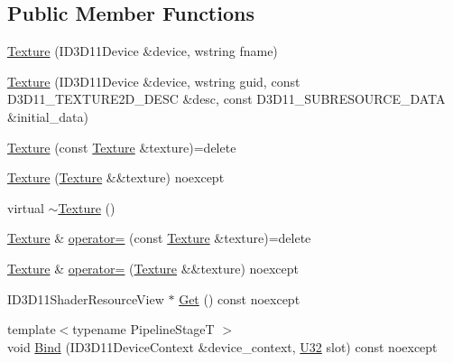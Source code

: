 \subsection*{Public Member Functions}
\begin{DoxyCompactItemize}
\item 
\mbox{\hyperlink{classmage_1_1rendering_1_1_texture_aedb80382410d26a47574d5032b33b981}{Texture}} (I\+D3\+D11\+Device \&device, wstring fname)
\item 
\mbox{\hyperlink{classmage_1_1rendering_1_1_texture_af8c954ea3d15176b57c2fee0fbf99649}{Texture}} (I\+D3\+D11\+Device \&device, wstring guid, const D3\+D11\+\_\+\+T\+E\+X\+T\+U\+R\+E2\+D\+\_\+\+D\+E\+SC \&desc, const D3\+D11\+\_\+\+S\+U\+B\+R\+E\+S\+O\+U\+R\+C\+E\+\_\+\+D\+A\+TA \&initial\+\_\+data)
\item 
\mbox{\hyperlink{classmage_1_1rendering_1_1_texture_adde9e2339d2c10f1fc527a0d8d41d335}{Texture}} (const \mbox{\hyperlink{classmage_1_1rendering_1_1_texture}{Texture}} \&texture)=delete
\item 
\mbox{\hyperlink{classmage_1_1rendering_1_1_texture_a25eb2aa2277478fb5c17af996d509c57}{Texture}} (\mbox{\hyperlink{classmage_1_1rendering_1_1_texture}{Texture}} \&\&texture) noexcept
\item 
virtual \mbox{\hyperlink{classmage_1_1rendering_1_1_texture_af0ca576b1131fc0ac70725127b4fa7e4}{$\sim$\+Texture}} ()
\item 
\mbox{\hyperlink{classmage_1_1rendering_1_1_texture}{Texture}} \& \mbox{\hyperlink{classmage_1_1rendering_1_1_texture_a8d6af2ca731e11e2f0ef382bc8417234}{operator=}} (const \mbox{\hyperlink{classmage_1_1rendering_1_1_texture}{Texture}} \&texture)=delete
\item 
\mbox{\hyperlink{classmage_1_1rendering_1_1_texture}{Texture}} \& \mbox{\hyperlink{classmage_1_1rendering_1_1_texture_a8c9062f5d8045272c254eb0fa1ab4feb}{operator=}} (\mbox{\hyperlink{classmage_1_1rendering_1_1_texture}{Texture}} \&\&texture) noexcept
\item 
I\+D3\+D11\+Shader\+Resource\+View $\ast$ \mbox{\hyperlink{classmage_1_1rendering_1_1_texture_a7180e555c8e9ba55b364aa0a395d9ab8}{Get}} () const noexcept
\item 
{\footnotesize template$<$typename Pipeline\+StageT $>$ }\\void \mbox{\hyperlink{classmage_1_1rendering_1_1_texture_a2189fabd729f433b96b62fa409968677}{Bind}} (I\+D3\+D11\+Device\+Context \&device\+\_\+context, \mbox{\hyperlink{namespacemage_a41c104c036fba3756a74e19f793eeaa1}{U32}} slot) const noexcept
\end{DoxyCompactItemize}
